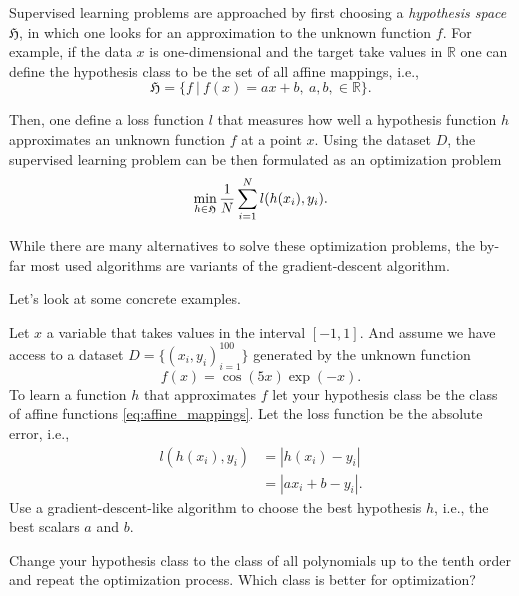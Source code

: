 Supervised learning problems are approached by first choosing a \emph{hypothesis
space} $\mathfrak{H}$, in which one looks for an approximation to the unknown function $f$. For example, if the data $x$ is one-dimensional and the target
take values in $\mathbb{R}$ one can define the hypothesis class to be the set of
all affine mappings, i.e., 
\begin{equation}
    \label{eq:affine_mappings}
\mathfrak{H} = \bigl\{f \ | \ f(x) = ax + b, \ a, b, \in \mathbb{R}    
\bigr\}.
\end{equation}

Then, one define a loss function $l$ that measures how well a hypothesis
function $h$ approximates an unknown function $f$ at a point $x$. Using the
dataset $D$, the supervised learning
problem can be then formulated as an optimization problem 
\begin{equation}
    \min_{h \in \frak{H}} \frac{1}{N}\sum_{i=1}^{N}l(h(x_i), y_i).
\end{equation}

While there are many alternatives to solve these optimization problems, the
by-far most used algorithms are variants of the gradient-descent algorithm. 

Let's look at some concrete examples. 

\begin{boxedexample}[Regression] \complementary{\theexample}
    \label{ex:regression}
    Let $x$ a variable that takes values in the interval $[-1,1]$. And assume we
    have access to a dataset $D = \{(x_i, y_i)_{i=1}^{100}\}$ generated by the unknown
    function 
    $$
    f(x) = \cos(5x) \exp(-x).
    $$ 
    To learn a function $h$ that approximates $f$ let your hypothesis class be
    the class of affine functions \eqref{eq:affine_mappings}. Let the loss
    function be the absolute error, i.e., 
    \begin{align*}
    l(h(x_i), y_i) &= |h(x_i)- y_i| \\
& = |ax_i + b - y_i|.
    \end{align*}
    Use a gradient-descent-like algorithm to choose the best hypothesis $h$,
    i.e., the best scalars $a$ and $b$. 

    Change your hypothesis class to the class of all polynomials up to the tenth
    order and repeat the optimization process. Which class is better for
    optimization?
\end{boxedexample}

\begin{boxedexample}[Classification] \complementary{\theexample}
    \label{ex:classification}
\end{boxedexample}

